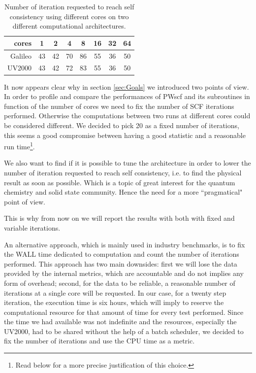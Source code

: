 \documentclass[a4paper,12pt]{article}
\begin{document}
\begin{table}[hhh!]
\begin{center}
\begin{tabular}{r|ccccccc}
\toprule
cores 	 &  1  &  2  &  4  &  8  &  16  &  32  &  64 \\
\midrule
Galileo	 & 43  & 42  & 70  & 86  &  55  &  36  &  50 \\ 
UV2000	 & 43  & 42  & 72  & 83  &  55  &  36  &  50 \\ 
\bottomrule
\end{tabular}
\end{center}
\caption{Number of iteration requested to reach self consistency using different cores on two different computational architectures.}
\label{tab:architectureIterations}
\end{table}



It now appears clear why in section \ref{sec:Goals} we introduced two points of view.
In order to profile and compare the performances of PWscf and its subroutines in function of the number of cores we need to fix the number of SCF iterations performed. Otherwise the computations between two runs at different cores could be considered different.
We decided to pick 20 as a fixed number of iterations, this seems a good compromise between having a good statistic and a 
reasonable run time\footnote{Read below for a more precise justification of this choice.}.

We also want to find if it is possible to tune the architecture in order to lower the number of iteration requested to reach self consistency, i.e. to find the physical result as soon as possible. Which is a topic of great interest for the quantum chemistry and solid state community.
Hence the need for a more ``pragmatical" point of view.

This is why from now on we will report the results with both with fixed and variable iterations.

An alternative approach, which is mainly used in industry benchmarks\cite{HPC}, is to fix the WALL time dedicated to computation and count the number of iterations performed.
This approach has two main downsides: 
first we will lose the data provided by the internal metrics, which are accountable and do not implies any form of overhead; 
second, for the data to be reliable, a reasonable number of iterations at a single core will be requested. 
In our case, for a twenty step iteration, the execution time is six hours, which will imply to reserve the computational resource for that amount of time for every test performed.
Since the time we had available was not indefinite and the resources, especially the UV2000, had to be shared without the help of a batch scheduler, we decided to fix the number of iterations and use the CPU time as a metric.
\end{document}
